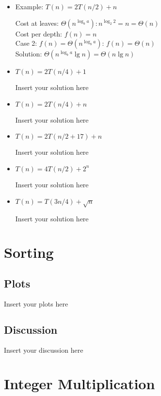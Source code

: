 \documentclass[a4paper]{article}
\begin{document}
\begin{itemize}

\item Example: $T(n) = 2T(n/2) + n$

Cost at leaves: $\Theta(n^{\log_b a}): n^{\log_2 2}=n=\Theta(n)$ \\
Cost per depth: $f(n)=n$ \\
Case 2: $f(n) = \Theta(n^{\log_b a})$: $f(n) = \Theta(n)$ \\
Solution: $\Theta(n^{\log_b a} \lg n) = \Theta(n \lg n)$

\item $T(n) = 2T(n/4) + 1$

Insert your solution here

\item $T(n) = 2T(n/4) + n$

Insert your solution here

\item $T(n) = 2T(n/2 + 17) + n$

Insert your solution here

\item $T(n) = 4T(n/2) + 2^n$

Insert your solution here

\item $T(n) = T(3n/4) + \sqrt{n}$

Insert your solution here

\end{itemize}

\section{Sorting}

\subsection{Plots}

Insert your plots here

\subsection{Discussion}

Insert your discussion here

\section{Integer Multiplication}
\end{document}

